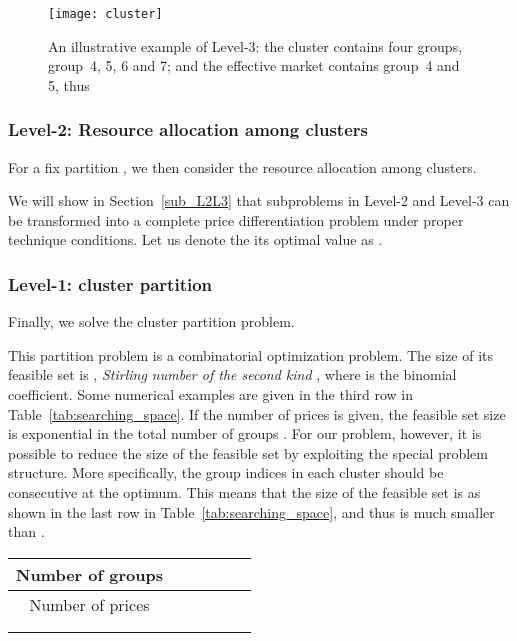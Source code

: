 \documentclass[twocolumn,10pt,twosided]{IEEEtran}
\begin{document}
\begin{figure}[ht]
\centering
\texttt{[image: cluster]}
\caption{An illustrative  example of Level-3: the cluster contains four groups, group~4, 5, 6 and 7; and the effective market contains group~4 and 5, thus }
\label{fig:cluster}
\end{figure}


\subsubsection{Level-2: Resource allocation among clusters} For a fix partition , we then consider the resource allocation among clusters.

We will show in Section~\ref{sub_L2L3} that subproblems in Level-2 and Level-3 can be transformed into a complete price differentiation problem under proper technique conditions. Let us denote the its optimal value as .

\subsubsection{Level-1: cluster partition} Finally, we solve the cluster partition problem.

This partition problem is a combinatorial optimization problem.
The size of its feasible set is , \emph{Stirling number of the second kind}
 \cite[Chap.13]{van2001course}, where  is the binomial coefficient. Some numerical examples are given in the third row in Table~\ref{tab:searching_space}. If the number of prices  is given, the feasible set size is exponential in the total number of groups . For our problem, however, it is possible to reduce the size of the feasible set by exploiting the special problem structure. More specifically, the group indices in each cluster should be consecutive at the optimum. This means that the size of the feasible set is   as shown in the last row in Table~\ref{tab:searching_space}, and thus is much smaller than .

\begin{table*}
\caption{Numerical examples for feasible set size of the partition problem in Level-1}
\label{tab:searching_space} \centering
\begin{tabular}{c|c|c|c|c|c}
\hline
Number of groups &\multicolumn{2}{|c|}{}&\multicolumn{2}{|c|}{}&{}\\
\hline
Number of prices & & &&&\\
\hline
&&&&&\\
\hline
&&&&&\\
\hline
\end{tabular}
\end{table*}
\end{document}
